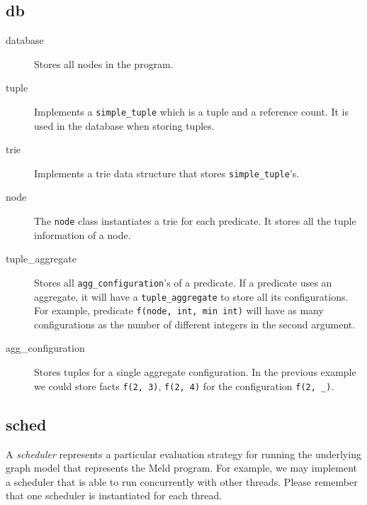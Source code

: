 \documentclass[11pt]{article}
\begin{document}
\subsection{db}

\begin{description}
   \item[database] Stores all nodes in the program.
   \item[tuple] Implements a \texttt{simple\_tuple} which is a tuple and a reference count. It is used in the database when storing tuples.
   \item[trie] Implements a trie data structure that stores \texttt{simple\_tuple}'s.
   \item[node] The \texttt{node} class instantiates a trie for each predicate. It stores all the tuple information of a node.
   \item[tuple\_aggregate] Stores all \texttt{agg\_configuration}'s of a predicate. If a predicate uses an aggregate, it will have a \texttt{tuple_aggregate} to store all its configurations. For example, predicate \texttt{f(node, int, min int)} will have as many configurations as the number of different integers in the second argument.
   \item[agg\_configuration] Stores tuples for a single aggregate configuration. In the previous example we could store facts \texttt{f(2, 3)}, \texttt{f(2, 4)} for the configuration \texttt{f(2, \_)}.
\end{description}

\subsection{sched}

A \emph{scheduler} represents a particular evaluation strategy for running the underlying graph model that represents the Meld program. For example, we may implement a scheduler that is able to run concurrently with other threads. Please remember that one scheduler is instantiated for each thread.
\end{document}
